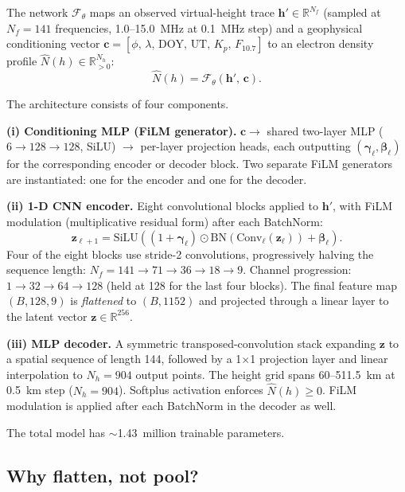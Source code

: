 \documentclass[11pt,twocolumn]{article}
\begin{document}
The network $\mathcal{F}_\theta$ maps an observed virtual-height trace
$\mathbf{h}' \in \mathbb{R}^{N_f}$ (sampled at $N_f = 141$ frequencies,
1.0--15.0~MHz at 0.1~MHz step) and a geophysical conditioning vector
$\mathbf{c} = [\phi,\,\lambda,\,\text{DOY},\,\text{UT},\,K_p,\,F_{10.7}]$
to an electron density profile $\hat{N}(h) \in \mathbb{R}^{N_h}_{>0}$:
\begin{equation}
  \hat{N}(h) = \mathcal{F}_\theta\!\left(\mathbf{h}',\,\mathbf{c}\right).
\end{equation}

The architecture consists of four components.

\textbf{(i) Conditioning MLP (FiLM generator).}
$\mathbf{c} \to$ shared two-layer MLP ($6 \to 128 \to 128$, SiLU) $\to$
per-layer projection heads, each outputting $(\boldsymbol{\gamma}_\ell,
\boldsymbol{\beta}_\ell)$ for the corresponding encoder or decoder block.
Two separate FiLM generators are instantiated: one for the encoder and one for
the decoder.

\textbf{(ii) 1-D CNN encoder.}
Eight convolutional blocks applied to $\mathbf{h}'$, with FiLM modulation
(multiplicative residual form) after each BatchNorm:
\begin{equation}
  \mathbf{z}_{\ell+1} = \text{SiLU}\!\left((1 + \boldsymbol{\gamma}_\ell) \odot
  \text{BN}(\text{Conv}_\ell(\mathbf{z}_\ell)) + \boldsymbol{\beta}_\ell\right).
\end{equation}
Four of the eight blocks use stride-2 convolutions, progressively halving the
sequence length: $N_f = 141 \to 71 \to 36 \to 18 \to 9$.
Channel progression: $1 \to 32 \to 64 \to 128$ (held at 128 for the last four
blocks).
The final feature map $(B, 128, 9)$ is \emph{flattened} to $(B, 1152)$ and
projected through a linear layer to the latent vector $\mathbf{z} \in
\mathbb{R}^{256}$.

\textbf{(iii) MLP decoder.}
A symmetric transposed-convolution stack expanding $\mathbf{z}$ to a spatial
sequence of length 144, followed by a 1$\times$1 projection layer and linear
interpolation to $N_h = 904$ output points.
The height grid spans 60--511.5~km at 0.5~km step ($N_h = 904$).
Softplus activation enforces $\hat{N}(h) \geq 0$.
FiLM modulation is applied after each BatchNorm in the decoder as well.

The total model has $\sim$1.43~million trainable parameters.

\subsection{Why flatten, not pool?}
\end{document}
